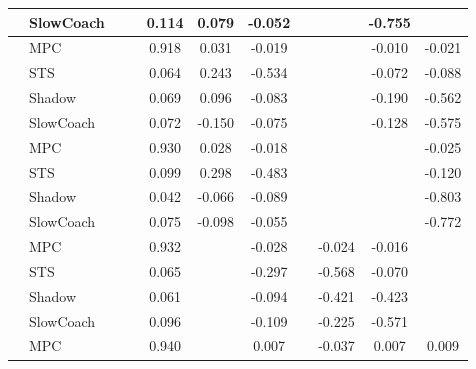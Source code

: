 \begin{tabular}{|l|l|*{9}{c|}}
                                                           & SlowCoach &       &        &     0.114 &  0.079 & -0.052 &     &      &  -0.755 &       \\
\midrule
[False, False, True, True, True, False, False, True, True] & MPC &       &        &     0.918 &  0.031 & -0.019 &     &      &  -0.010 &   -0.021 \\
                                                           & STS &       &        &     0.064 &  0.243 & -0.534 &     &      &  -0.072 &   -0.088 \\
                                                           & Shadow &       &        &     0.069 &  0.096 & -0.083 &     &      &  -0.190 &   -0.562 \\
                                                           & SlowCoach &       &        &     0.072 & -0.150 & -0.075 &     &      &  -0.128 &   -0.575 \\
\midrule
[False, False, True, True, True, False, False, False, True] & MPC &       &        &     0.930 &  0.028 & -0.018 &     &      &      &   -0.025 \\
                                                           & STS &       &        &     0.099 &  0.298 & -0.483 &     &      &      &   -0.120 \\
                                                           & Shadow &       &        &     0.042 & -0.066 & -0.089 &     &      &      &   -0.803 \\
                                                           & SlowCoach &       &        &     0.075 & -0.098 & -0.055 &     &      &      &   -0.772 \\
\midrule
[False, False, True, False, True, False, True, True, False] & MPC &       &        &     0.932 &     & -0.028 &     &  -0.024 &  -0.016 &       \\
                                                           & STS &       &        &     0.065 &     & -0.297 &     &  -0.568 &  -0.070 &       \\
                                                           & Shadow &       &        &     0.061 &     & -0.094 &     &  -0.421 &  -0.423 &       \\
                                                           & SlowCoach &       &        &     0.096 &     & -0.109 &     &  -0.225 &  -0.571 &       \\
\midrule
[False, False, True, False, True, False, True, True, True] & MPC &       &        &     0.940 &     &  0.007 &     &  -0.037 &   0.007 &    0.009 \\

\end{tabular}
